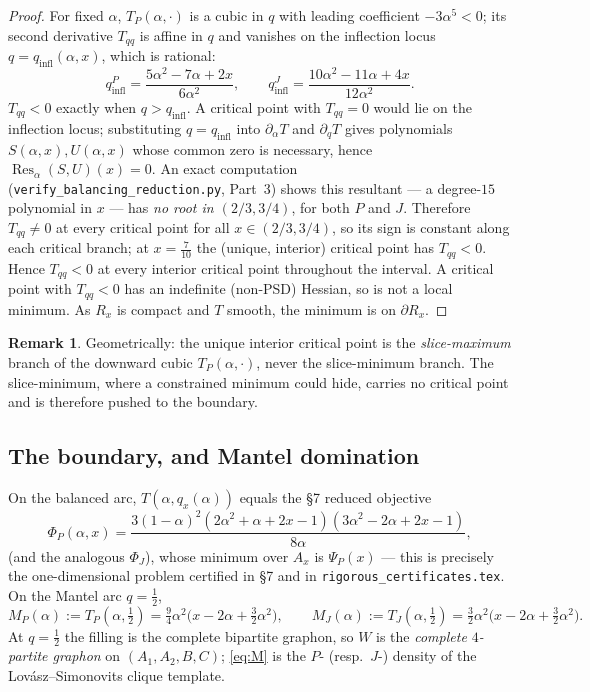 \documentclass[11pt]{amsart}
\theoremstyle{definition}
\newtheorem{remark}[theorem]{Remark}
\begin{document}
\begin{proof}
For fixed $\alpha$, $T_P(\alpha,\cdot)$ is a cubic in $q$ with leading
coefficient $-3\alpha^5<0$; its second derivative $T_{qq}$ is affine in $q$
and vanishes on the inflection locus $q=q_{\mathrm{infl}}(\alpha,x)$,
which is rational:
\[
   q_{\mathrm{infl}}^{P}=\frac{5\alpha^2-7\alpha+2x}{6\alpha^2},
   \qquad
   q_{\mathrm{infl}}^{J}=\frac{10\alpha^2-11\alpha+4x}{12\alpha^2}.
\]
$T_{qq}<0$ exactly when $q>q_{\mathrm{infl}}$.  A critical point with
$T_{qq}=0$ would lie on the inflection locus; substituting
$q=q_{\mathrm{infl}}$ into $\partial_\alpha T$ and $\partial_q T$ gives
polynomials $S(\alpha,x),U(\alpha,x)$ whose common zero is necessary, hence
$\operatorname{Res}_\alpha(S,U)(x)=0$.  An exact computation
(\texttt{verify\_balancing\_reduction.py}, Part~3) shows this resultant ---
a degree-$15$ polynomial in $x$ --- has \emph{no root in $(2/3,3/4)$}, for
both $P$ and $J$.  Therefore $T_{qq}\ne0$ at every critical point for all
$x\in(2/3,3/4)$, so its sign is constant along each critical branch; at
$x=\tfrac7{10}$ the (unique, interior) critical point has $T_{qq}<0$.  Hence
$T_{qq}<0$ at every interior critical point throughout the interval.  A
critical point with $T_{qq}<0$ has an indefinite (non-PSD) Hessian, so is not
a local minimum.  As $R_x$ is compact and $T$ smooth, the minimum is on
$\partial R_x$.
\end{proof}

\begin{remark}
Geometrically: the unique interior critical point is the \emph{slice-maximum}
branch of the downward cubic $T_P(\alpha,\cdot)$, never the slice-minimum
branch.  The slice-minimum, where a constrained minimum could hide, carries
no critical point and is therefore pushed to the boundary.
\end{remark}

\subsection{The boundary, and Mantel domination}
\label{sec:mantel}

On the balanced arc, $T(\alpha,q_x(\alpha))$ equals the \S7 reduced objective
\[
   \Phi_P(\alpha,x)=\frac{3(1-\alpha)^2(2\alpha^2+\alpha+2x-1)(3\alpha^2-2\alpha+2x-1)}{8\alpha},
\]
(and the analogous $\Phi_J$), whose minimum over $A_x$ is $\Psi_P(x)$ ---
this is precisely the one-dimensional problem certified in \S7 and in
\texttt{rigorous\_certificates.tex}.  On the Mantel arc $q=\tfrac12$,
\begin{equation}
\label{eq:M}
   M_P(\alpha):=T_P(\alpha,\tfrac12)=\tfrac94\alpha^2\bigl(x-2\alpha+\tfrac32\alpha^2\bigr),
   \qquad
   M_J(\alpha):=T_J(\alpha,\tfrac12)=\tfrac32\alpha^2\bigl(x-2\alpha+\tfrac32\alpha^2\bigr).
\end{equation}
At $q=\tfrac12$ the filling is the complete bipartite graphon, so $W$ is the
\emph{complete $4$-partite graphon} on $(A_1,A_2,B,C)$; \eqref{eq:M} is the
$P$- (resp.\ $J$-) density of the Lov\'asz--Simonovits clique template.
\end{document}
